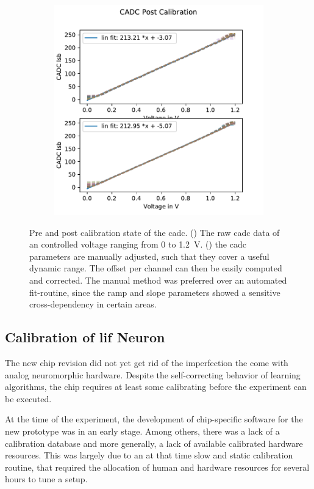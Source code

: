 \begin{figure}
\begin{subfigure}{0.5\textwidth}
		\includegraphics[width=\textwidth]{figures/temporary/cadc_post_calib_hx70.pdf}
		\label{postcadccalib}
	\end{subfigure}
	\caption[Pre and post calibration state of the \gls{cadc}]{Pre and post calibration state of the \gls{cadc}. () The raw cadc data of an controlled voltage ranging from 0 to \SI{1.2}{\V}. () the cadc parameters are manually adjusted, such that they cover a useful dynamic range. The offset per channel can then be easily computed and corrected. The manual method was preferred over an automated fit-routine, since the ramp and slope parameters showed a sensitive cross-dependency in certain areas.}
	\label{cadccalibration}
\end{figure}

\subsection{Calibration of \gls{lif} Neuron}
The new chip revision did not yet get rid of the imperfection the come with analog neuromorphic hardware. Despite the self-correcting behavior of learning algorithms, the chip requires at least some calibrating before the experiment can be executed.

At the time of the experiment, the development of chip-specific software for the new prototype was in an early stage. Among others, there was a lack of a calibration database and more generally, a lack of available calibrated hardware resources. This was largely due to an at that time slow and static calibration routine, that required the allocation of human and hardware resources for several hours to tune a setup.

